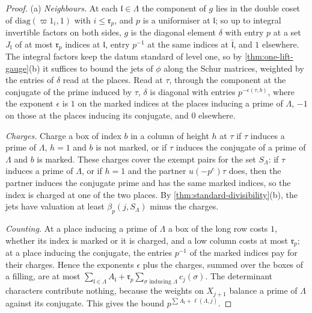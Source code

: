 \begin{proof}
(a) \emph{Neighbours.} At each $\mathfrak l\in\Lambda$ the component of $g$ lies in the double coset of $\mathrm{diag}(\varpi1_i,1)$ with $i\le\mathfrak r_p$, and $p$ is a uniformiser at $\mathfrak l$; so up to integral invertible factors on both sides, $g$ is the diagonal element $\delta$ with entry $p$ at a set $J_{\mathfrak l}$ of at most $\mathfrak r_p$ indices at $\mathfrak l$, entry
$p^{-1}$ at the same indices at $\bar{\mathfrak l}$, and $1$ elsewhere. The integral factors keep the datum standard of level one, so by \cref{thm:one-lift-gauge}(b) it suffices to bound the jets of $\phi$ along the Schur matrices, weighted by the entries of $\delta$ read at the places. Read at $\tau$, through the component at the conjugate of the prime induced by
$\tau$, $\delta$ is diagonal with entries $p^{-\epsilon(\tau,b)}$, where the exponent $\epsilon$ is $1$ on the marked indices at the places inducing a prime of $\Lambda$, $-1$ on those at the places inducing its conjugate, and $0$ elsewhere.

\emph{Charges.} Charge a box of index $b$ in a column of height $h$ at $\tau$ if $\tau$ induces a prime of $\Lambda$, $h=1$ and $b$ is not marked, or if $\tau$ induces the conjugate of a prime of $\Lambda$ and $b$ is marked. These charges cover the exempt pairs for the set $S_\Lambda$: if $\tau$ induces a prime of $\Lambda$, or if $h=1$ and the partner $u(-p^e)\tau$ does, then the
partner induces the conjugate prime and has the same marked indices, so the index is charged at one of the two places. By \cref{thm:standard-divisibility}(b), the jets have valuation at least $\beta_p(j,S_\Lambda)$ minus the charges.

\emph{Counting.} At a place inducing a prime of $\Lambda$ a box of the long row costs $1$, whether its index is marked or it is charged, and a low column costs at most $\mathfrak r_p$; at a place inducing the conjugate, the entries $p^{-1}$ of the marked indices pay for their charges. Hence the exponents $\epsilon$ plus the charges, summed over the boxes of a filling, are at most
$\sum_{\mathfrak l\in\Lambda}A_{\mathfrak l}+\mathfrak r_p\sum_{\sigma\text{ inducing }\Lambda}c_j(\sigma)$. The determinant characters contribute nothing, because the weights on $X_{j+1}$ balance a prime of $\Lambda$ against its conjugate. This gives the bound $p^{\sum A_{\mathfrak l}+\ell(\Lambda,j)}$.


\end{proof}
